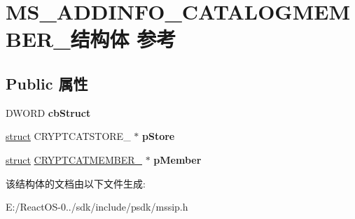 \hypertarget{struct_m_s___a_d_d_i_n_f_o___c_a_t_a_l_o_g_m_e_m_b_e_r__}{}\section{M\+S\+\_\+\+A\+D\+D\+I\+N\+F\+O\+\_\+\+C\+A\+T\+A\+L\+O\+G\+M\+E\+M\+B\+E\+R\+\_\+结构体 参考}
\label{struct_m_s___a_d_d_i_n_f_o___c_a_t_a_l_o_g_m_e_m_b_e_r__}
\subsection*{Public 属性}
\begin{DoxyCompactItemize}
\item 
\mbox{\label{struct_m_s___a_d_d_i_n_f_o___c_a_t_a_l_o_g_m_e_m_b_e_r___ae523dd813ab11184749cdd19709b830a}} 
D\+W\+O\+RD {\bfseries cb\+Struct}
\item 
\mbox{\label{struct_m_s___a_d_d_i_n_f_o___c_a_t_a_l_o_g_m_e_m_b_e_r___a2e01f52fd60aba8532e2d1272e260966}} 
\hyperlink{interfacestruct}{struct} C\+R\+Y\+P\+T\+C\+A\+T\+S\+T\+O\+R\+E\+\_\+ $\ast$ {\bfseries p\+Store}
\item 
\mbox{\label{struct_m_s___a_d_d_i_n_f_o___c_a_t_a_l_o_g_m_e_m_b_e_r___a1fc4bd9b151b7c4caba8b56bde62ddbb}} 
\hyperlink{interfacestruct}{struct} \hyperlink{struct_c_r_y_p_t_c_a_t_m_e_m_b_e_r__}{C\+R\+Y\+P\+T\+C\+A\+T\+M\+E\+M\+B\+E\+R\+\_\+} $\ast$ {\bfseries p\+Member}
\end{DoxyCompactItemize}


该结构体的文档由以下文件生成\+:\begin{DoxyCompactItemize}
\item 
E\+:/\+React\+O\+S-\/0../sdk/include/psdk/mssip.\+h\end{DoxyCompactItemize}
